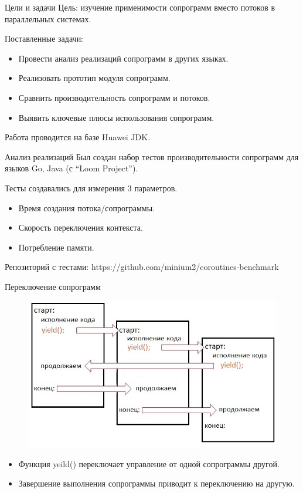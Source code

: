 \begin{frame}{Цели и задачи}
	Цель: изучение применимости сопрограмм вместо потоков в параллельных системах.
	\par
	Поставленные задачи:
	\begin{itemize}
		\item Провести анализ реализаций сопрограмм в других языках.
		\item Реализовать прототип модуля сопрограмм.
		\item Сравнить производительность сопрограмм и потоков.
		\item Выявить ключевые плюсы использования сопрограмм.
	\end{itemize}
	Работа проводится на базе Huawei JDK.
\end{frame} 

\begin{frame}{Анализ реализаций}
	Был создан набор тестов производительности сопрограмм для языков Go, Java (с “Loom Project”).
	
	Тесты создавались для измерения 3 параметров.
	\begin{itemize}
		\item Время создания потока/сопрограммы. 
		\item Скорость переключения контекста.
		\item Потребление памяти.
	\end{itemize}
	Репозиторий с тестами: https://github.com/minium2/coroutines-benchmark
\end{frame}

\begin{frame}{Переключение сопрограмм}
	\begin{figure}
		\includegraphics[scale=0.5]{images/scheme.jpg}
	\end{figure}
	\par
	\begin{itemize}
		\item Функция yeild() переключает управление от одной сопрограммы другой.
		\item Завершение выполнения сопрограммы приводит к переключению на другую.
	\end{itemize}
\end{frame}

